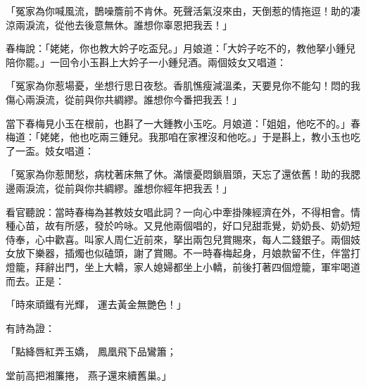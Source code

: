 「冤家為你喊風流，鵲噪簷前不肯休。死聲活氣沒來由，天倒惹的情拖逗！助的凄涼兩淚流，從他去後意無休。誰想你辜恩把我丟！」

春梅說：「姥姥，你也教大妗子吃盃兒。」月娘道：「大妗子吃不的，教他拏小鍾兒陪你罷。」一回令小玉斟上大妗子一小鍾兒酒。兩個妓女又唱道：

「冤家為你惹場憂，坐想行思日夜愁。香肌憔瘦減溫柔，天要見你不能勾！悶的我傷心兩淚流，從前與你共綢繆。誰想你今番把我丟！」

當下春梅見小玉在根前，也斟了一大鍾教小玉吃。月娘道：「姐姐，他吃不的。」春梅道：「姥姥，他也吃兩三鍾兒。我那咱在家裡沒和他吃。」于是斟上，教小玉也吃了一盃。妓女唱道：

「冤家為你惹閒愁，病枕著床無了休。滿懷憂悶鎖眉頭，天忘了還依舊！助的我腮邊兩淚流，從前與你共綢繆。誰想你經年把我丟！」

看官聽說：當時春梅為甚教妓女唱此詞？一向心中牽掛陳經濟在外，不得相會。情種心苗，故有所感，發於吟咏。又見他兩個唱的，好口兒甜乖覺，奶奶長、奶奶短侍奉，心中歡喜。叫家人周仁近前來，拏出兩包兒賞賜來，每人二錢銀子。兩個妓女放下樂器，插燭也似磕頭，謝了賞賜。不一時春梅起身，月娘款留不住，伴當打燈籠，拜辭出門，坐上大轎，家人媳婦都坐上小轎，前後打著四個燈籠，軍牢喝道而去。正是：

「時來頑鐵有光輝，  運去黃金無艷色！」

有詩為證：

「點絳唇紅弄玉嬌，  鳳凰飛下品鸞簫；

堂前高把湘簾捲，  燕子還來續舊巢。」

